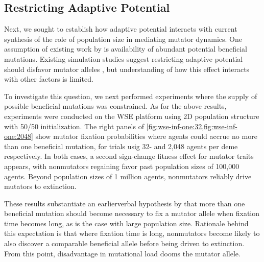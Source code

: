 \subsection{Restricting Adaptive Potential}
\label{sec:restricting-adaptive-potential}

Next, we sought to establish how adaptive potential interacts with current synthesis of the role of population size in mediating mutator dynamics.
One assumption of existing work by \citet{raynes2018sign} is availability of abundant potential beneficial mutations.
Existing simulation studies suggest restricting adaptive potential should disfavor mutator alleles \citep{tenaillon1999mutators}, but understanding of how this effect interacts with other factors is limited.

To investigate this question, we next performed experiments where the supply of possible beneficial mutations was constrained.
As for the above results, experiments were conducted on the WSE platform using 2D population structure with 50/50 initialization.
The right panels of \cref{fig:wse-inf-one:32,fig:wse-inf-one:2048} show mutator fixation probabilities where agents could accrue no more than one beneficial mutation, for trials usig 32- and 2,048 agents per deme respectively.
In both cases, a second sign-change fitness effect for mutator traits appears, with nonmutators regaining favor past population sizes of 100,000 agents.
Beyond population sizes of 1 million agents, nonmutators reliably drive mutators to extinction.

These results substantiate an earlierverbal hypothesis by \citet{desai2011balance} that more than one beneficial mutation should become necessary to fix a mutator allele when fixation time becomes long, as is the case with large population size.
Rationale behind this expectation is that where fixation time is long, nonmutators become likely to also discover a comparable beneficial allele before being driven to extinction.
From this point, disadvantage in mutational load dooms the mutator allele.



